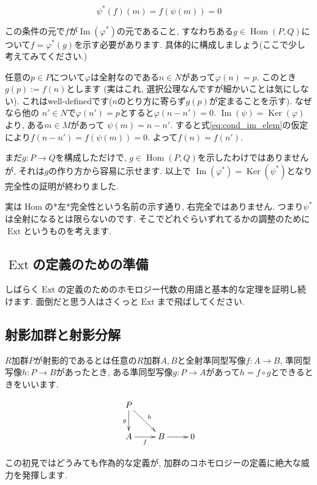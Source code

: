 \documentclass{jsarticle}
\newcommand{\makeop}[1]{\mathop{\mathrm{#1}}\nolimits}
\def\Im{\makeop{Im}}
\def\Ker{\makeop{Ker}}
\def\Hom{\makeop{Hom}}
\def\Ext{\makeop{Ext}}
\theoremstyle{definition}
\numberwithin{theorem}{section}
\begin{document}
\begin{equation}
\label{eq:cond_im_elem}
\psi^*(f)(m) = f(\psi(m)) = 0
\end{equation}

この条件の元で$f$が$\Im(\varphi^*)$の元であること, すなわちある$g\in\Hom(P, Q)$について$f = \varphi^*(g)$を示す必要があります. 具体的に構成しましょう(ここで少し考えてみてください.)

任意の$p\in P$について$\varphi$は全射なのである$n\in N$があって$\varphi(n) = p$. このとき$g(p) := f(n)$とします
(実はこれ, 選択公理なんですが細かいことは気にしない). これはwell-definedです($n$のとり方に寄らず$g(p)$が定まることを示す). なぜなら他の
$n'\in N$で$\varphi(n') = p$とすると$\varphi(n-n') = 0$. $\Im(\psi) = \Ker(\varphi)$より, ある$m\in M$があって
$\psi(m) = n-n'$. すると式\ref{eq:cond_im_elem}の仮定により$f(n-n') = f(\psi(m)) = 0$. よって$f(n) = f(n')$.

まだ$g: P\rightarrow Q$を構成しただけで, $g\in\Hom(P, Q)$を示したわけではありませんが, それは$g$の作り方から容易に示せます. 以上で
$\Im(\varphi^*) = \Ker(\psi^*)$となり完全性の証明が終わりました. 

実は$\Hom$の*左*完全性という名前の示す通り, 右完全ではありません. つまり$\psi^*$は全射になるとは限らないのです. そこでどれぐらいずれてるかの調整のために$\Ext$というものを考えます.

\subsection{$\Ext$の定義のための準備}
しばらく$\Ext$の定義のためのホモロジー代数の用語と基本的な定理を証明し続けます. 面倒だと思う人はさくっと$\Ext$まで飛ばしてください.

\subsection{射影加群と射影分解}
\label{sc:proj_module}
$R$加群$P$が射影的であるとは任意の$R$加群$A, B$と全射準同型写像$f: A\rightarrow B$, 準同型写像$h: P\rightarrow B$があったとき, 
ある準同型写像$g: P\rightarrow A$があって$h = f\circ g$とできるときをいいます.

\begin{equation*}
\xymatrix{
  P \ar[dr]^h \ar[d]_g & \\
  A \ar[r]_f & B \ar[r] & 0
}
\end{equation*}

この初見ではどうみても作為的な定義が, 加群のコホモロジーの定義に絶大な威力を発揮します.
\end{document}
